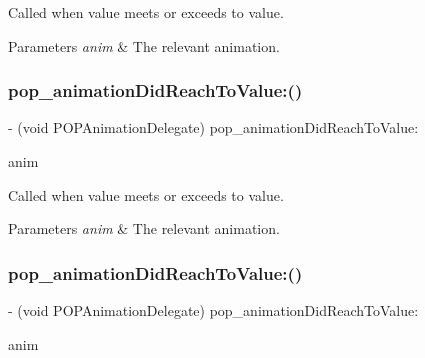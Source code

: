 Called when value meets or exceeds to value. 
\begin{DoxyParams}{Parameters}
{\em anim} & The relevant animation. \\
\hline
\end{DoxyParams}
\mbox{\label{protocol_p_o_p_animation_delegate_01-p_a3c4147f706696ad9618d732439c9d0fb}} 
\subsubsection{\texorpdfstring{pop\+\_\+animation\+Did\+Reach\+To\+Value\+:()}{pop\_animationDidReachToValue:()}\hspace{0.1cm}{\footnotesize\ttfamily [2/3]}}
{\footnotesize\ttfamily -\/ (void P\+O\+P\+Animation\+Delegate) pop\+\_\+animation\+Did\+Reach\+To\+Value\+: \begin{DoxyParamCaption}\item[{(\mbox{\hyperlink{interface_p_o_p_animation}{P\+O\+P\+Animation}} $\ast$)}]{anim }\end{DoxyParamCaption}\hspace{0.3cm}{\ttfamily [optional]}}

Called when value meets or exceeds to value. 
\begin{DoxyParams}{Parameters}
{\em anim} & The relevant animation. \\
\hline
\end{DoxyParams}
\mbox{\label{protocol_p_o_p_animation_delegate_01-p_a3c4147f706696ad9618d732439c9d0fb}} 
\subsubsection{\texorpdfstring{pop\+\_\+animation\+Did\+Reach\+To\+Value\+:()}{pop\_animationDidReachToValue:()}\hspace{0.1cm}{\footnotesize\ttfamily [3/3]}}
{\footnotesize\ttfamily -\/ (void P\+O\+P\+Animation\+Delegate) pop\+\_\+animation\+Did\+Reach\+To\+Value\+: \begin{DoxyParamCaption}\item[{(\mbox{\hyperlink{interface_p_o_p_animation}{P\+O\+P\+Animation}} $\ast$)}]{anim }\end{DoxyParamCaption}\hspace{0.3cm}{\ttfamily [optional]}}

